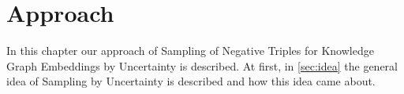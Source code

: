 \chapter{Approach}
\label{ch:approach}

In this chapter our approach of Sampling of Negative Triples for Knowledge Graph Embeddings by Uncertainty is described.
At first, in \autoref{sec:idea} the general idea of Sampling by Uncertainty is described and how this idea came about.







